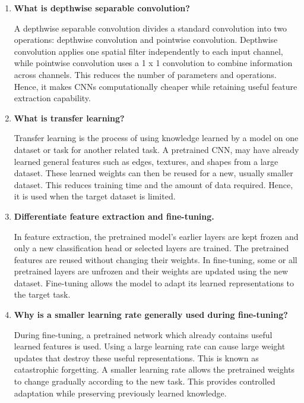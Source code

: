 \documentclass[10pt]{article}
\begin{document}
\begin{enumerate}
\item \textbf{What is depthwise separable convolution?}

\vspace{5mm}
A depthwise separable convolution divides a standard convolution into two operations: depthwise convolution and pointwise convolution. 
Depthwise convolution applies one spatial filter independently to each input channel, while pointwise convolution uses a 1 x 1 convolution to combine information across channels.
This reduces the number of parameters and operations. Hence, it makes CNNs computationally cheaper while retaining useful feature extraction capability.
\vspace{3mm}

\item \textbf{What is transfer learning?}

\vspace{5mm}
Transfer learning is the process of using knowledge learned by a model on one dataset or task for another related task. 
A pretrained CNN, may have already learned general features such as edges, textures, and shapes from a large dataset. 
These learned weights can then be reused for a new, usually smaller dataset. This reduces training time and the amount of data required. 
Hence, it is used when the target dataset is limited.
\vspace{3mm}

\item \textbf{Differentiate feature extraction and fine-tuning.}

\vspace{5mm}
In feature extraction, the pretrained model's earlier layers are kept frozen and only a new classification head or selected layers are trained. 
The pretrained features are reused without changing their weights. 
In fine-tuning, some or all pretrained layers are unfrozen and their weights are updated using the new dataset. 
Fine-tuning allows the model to adapt its learned representations to the target task.
\vspace{3mm}

\item \textbf{Why is a smaller learning rate generally used during fine-tuning?}

\vspace{5mm}
During fine-tuning, a pretrained network which already contains useful learned features is used. 
Using a large learning rate can cause large weight updates that destroy these useful representations. This is known as catastrophic forgetting. 
A smaller learning rate allows the pretrained weights to change gradually according to the new task. 
This provides controlled adaptation while preserving previously learned knowledge.
\vspace{3mm}


\end{enumerate}
\end{document}
